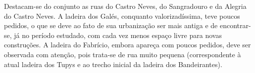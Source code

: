 




Destacam-se do conjunto as ruas do Castro Neves, do Sangradouro e da Alegria do Castro Neves. A ladeira dos Galés, conquanto valorizadíssima, teve poucos pedidos, o que se deve ao fato de sua urbanização ser mais antiga e de encontrar-se, já no período estudado, com cada vez menos espaço livre para novas construções. A ladeira do Fabrício, embora apareça com poucos pedidos, deve ser observada com atenção, pois trata-se de rua muito pequena (correspondente à atual ladeira dos Tupys e ao trecho inicial da ladeira dos Bandeirantes).


